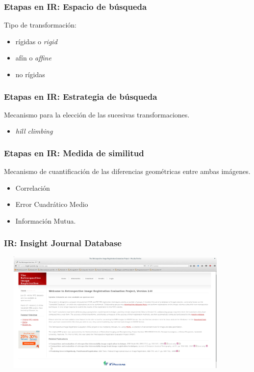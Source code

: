 \documentclass{beamer} %
\begin{document}
\begin{frame}
\frametitle{Etapas en IR: Espacio de búsqueda}

Tipo de transformación:

\pause
\begin{itemize}
\item rígidas o \textit{rigid}
\item afín o \textit{affine}
\item no rígidas
\end{itemize}

\end{frame}

\begin{frame}
\frametitle{Etapas en IR: Estrategia de búsqueda}

Mecanismo para la elección de las sucesivas transformaciones.

\pause
\begin{itemize}
\item \textit{hill climbing}
\end{itemize}

\end{frame}

\begin{frame}
\frametitle{Etapas en IR: Medida de similitud}

Mecanismo de cuantificación de las diferencias geométricas entre ambas imágenes.

\pause
\begin{itemize}
\item Correlación
\item Error Cuadrático Medio
\item Información Mutua.
\end{itemize}

\end{frame}

\begin{frame}
\frametitle{IR: Insight Journal Database}
\includegraphics[height=6cm, width=12cm]{images/IJD.png}
\end{frame}
\end{document}
